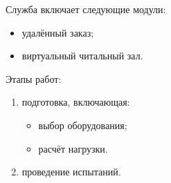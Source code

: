 Служба включает следующие модули:

\begin{itemize}
  \item удалённый заказ;
  \item виртуальный читальный зал.
\end{itemize}

Этапы работ:

\begin{enumerate}
  \item подготовка, включающая:
    \begin{itemize}
      \item выбор оборудования;
      \item расчёт нагрузки.
    \end{itemize}
  \item проведение испытаний.
\end{enumerate}
